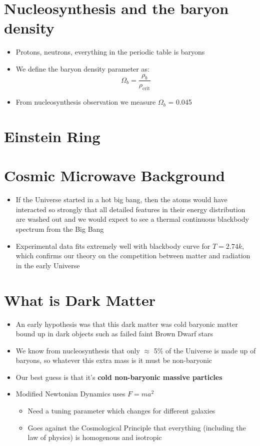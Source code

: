 \documentclass{article}
\begin{document}
\section{Nucleosynthesis and the baryon density}
\begin{itemize}
\item Protons, neutrons, everything in the periodic table is baryons
\item We define the baryon density parameter as:
\begin{equation}
\Omega_b=\frac{\rho_b}{\rho_\text{crit}}
\end{equation}
\item From nucleosynthesis observation we measure $\Omega_b$ = 0.045
\end{itemize}
\section{Einstein Ring}
\section{Cosmic Microwave Background}
\begin{itemize}
\item If the Universe started in a hot big bang, then the atoms would have interacted so strongly that all detailed features in their energy distribution are washed out and we would expect to see a thermal continuous blackbody spectrum from the Big Bang
\item Experimental data fits extremely well with blackbody curve for $T=2.74k$, which confirms our theory on the competition between matter and radiation in the early Universe
\end{itemize}
\section{What is Dark Matter}
\begin{itemize}
\item An early hypothesis was that this dark matter was cold baryonic matter bound up in dark objects such as failed faint Brown Dwarf stars
\item We know from nucleosynthesis that only $\approx$ 5\% of the Universe is made up of baryons, so whatever this extra mass is it must be
non-baryonic
\item Our best guess is that it's \textbf{cold non-baryonic massive particles}
\item Modified Newtonian Dynamics uses $F=ma^2$
\begin{itemize}
\item Need a tuning parameter which changes for different galaxies
\item Goes against the Cosmological Principle that everything (including the law
of physics) is homogenous and isotropic
\end{itemize}
\end{itemize}
\end{document}
